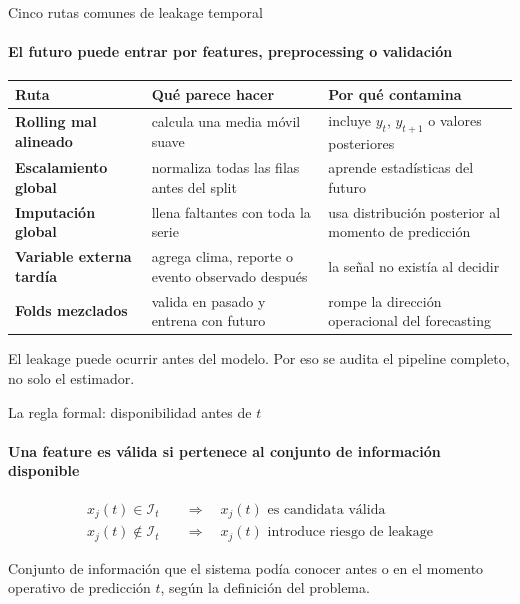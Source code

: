 \documentclass[aspectratio=169,11pt]{beamer}  %
\newcommand{\hrow}{\rowcolor{mlcream}}
\begin{document}

\begin{frame}{Cinco rutas comunes de leakage temporal}
\framesubtitle{El futuro puede entrar por features, preprocessing o validación}
\centering\small
\begin{tabular}{@{}l P{0.32\textwidth} P{0.32\textwidth}@{}}
\toprule
\hrow \textbf{Ruta} & Qué parece hacer & Por qué contamina\\
\midrule
\textbf{Rolling mal alineado} & calcula una media móvil suave & incluye $y_t$, $y_{t+1}$ o valores posteriores\\
\textbf{Escalamiento global} & normaliza todas las filas antes del split & aprende estadísticas del futuro\\
\textbf{Imputación global} & llena faltantes con toda la serie & usa distribución posterior al momento de predicción\\
\textbf{Variable externa tardía} & agrega clima, reporte o evento observado después & la señal no existía al decidir\\
\textbf{Folds mezclados} & valida en pasado y entrena con futuro & rompe la dirección operacional del forecasting\\
\bottomrule
\end{tabular}

\vspace{0.6em}
El leakage puede ocurrir antes del modelo. Por eso se audita el pipeline completo, no solo el estimador.
\end{frame}

\begin{frame}{La regla formal: disponibilidad antes de $t$}
\framesubtitle{Una feature es válida si pertenece al conjunto de información disponible}
\Large
\begin{align*}
x_j(t) \in \mathcal{I}_t \quad &\Longrightarrow \quad x_j(t) \text{ es candidata válida}\\[0.8em]
x_j(t) \notin \mathcal{I}_t \quad &\Longrightarrow \quad x_j(t) \text{ introduce riesgo de leakage}
\end{align*}
\normalsize
\begin{defbox}[$\mathcal{I}_t$]
Conjunto de información que el sistema podía conocer antes o en el momento operativo de predicción $t$, según la definición del problema.
\end{defbox}
\end{frame}
\end{document}
